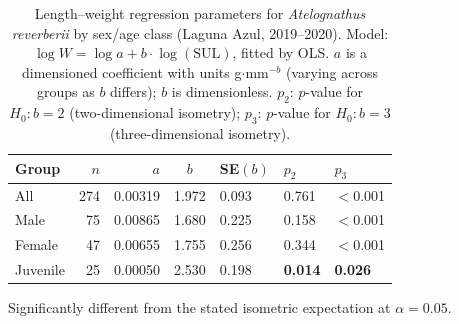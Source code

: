 \begin{table}[H]
\centering
\caption{Length--weight regression parameters for \textit{Atelognathus
reverberii} by sex/age class (Laguna Azul, 2019--2020). Model:
$\log W = \log a + b \cdot \log(\mathrm{SUL})$, fitted by OLS.
$a$ is a dimensioned coefficient with units g$\cdot$mm$^{-b}$ (varying
across groups as $b$ differs); $b$ is dimensionless.
$p_2$: $p$-value for $H_0\colon b = 2$ (two-dimensional isometry);
$p_3$: $p$-value for $H_0\colon b = 3$ (three-dimensional isometry).}
\label{tab:lw}
\begin{threeparttable}
\begin{tabular}{lrrclll}
\toprule
Group & $n$ & $a$ & $b$ & SE$(b)$ & $p_2$ & $p_3$\\
\midrule
All      & 274 & 0.00319 & 1.972 & 0.093 & 0.761 & $<$0.001\\
Male     &  75 & 0.00865 & 1.680 & 0.225 & 0.158 & $<$0.001\\
Female   &  47 & 0.00655 & 1.755 & 0.256 & 0.344 & $<$0.001\\
Juvenile &  25 & 0.00050 & 2.530 & 0.198 & \textbf{0.014}\tnote{*} & \textbf{0.026}\tnote{*}\\
\bottomrule
\end{tabular}
\begin{tablenotes}[flushleft]\footnotesize
  \item[*] Significantly different from the stated isometric expectation
  at $\alpha = 0.05$.
\end{tablenotes}
\end{threeparttable}
\end{table}
